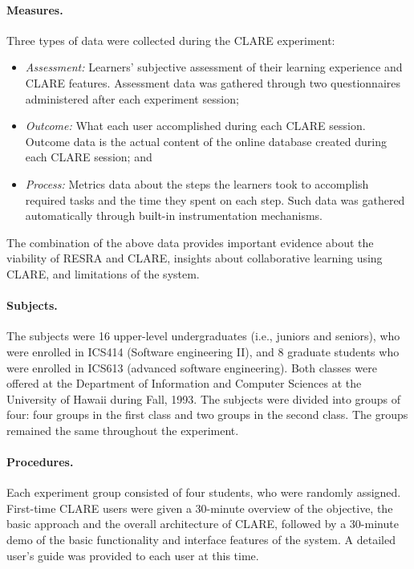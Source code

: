 \paragraph{Measures.}

Three types of data were collected during the CLARE experiment:

\begin{itemize}
\item {\it Assessment:\/} Learners' subjective assessment of their learning
  experience and CLARE features. Assessment data was gathered through two
  questionnaires administered after each experiment session;
  
\item {\it Outcome:\/} What each user accomplished during each CLARE
  session. Outcome data is the actual content of the online database
  created during each CLARE session; and
  
\item {\it Process: \/} Metrics data about the steps the learners took to
  accomplish required tasks and the time they spent on each step. Such 
  data was gathered automatically through built-in instrumentation
  mechanisms.
\end{itemize}

The combination of the above data provides important evidence about the
viability of RESRA and CLARE, insights about collaborative learning using
CLARE, and limitations of the system.


\paragraph{Subjects.}

The subjects were 16 upper-level undergraduates (i.e., juniors and
seniors), who were enrolled in ICS414 (Software engineering II), and 8
graduate students who were enrolled in ICS613 (advanced software
engineering). Both classes were offered at the Department of Information
and Computer Sciences at the University of Hawaii during Fall, 1993. The
subjects were divided into groups of four: four groups in the first class
and two groups in the second class. The groups remained the same throughout
the experiment.

\paragraph{Procedures.}

Each experiment group consisted of four students, who were randomly
assigned. First-time CLARE users were given a 30-minute overview of the
objective, the basic approach and the overall architecture of CLARE,
followed by a 30-minute demo of the basic functionality and interface
features of the system. A detailed user's guide \cite{csdl-93-15} was
provided to each user at this time.

